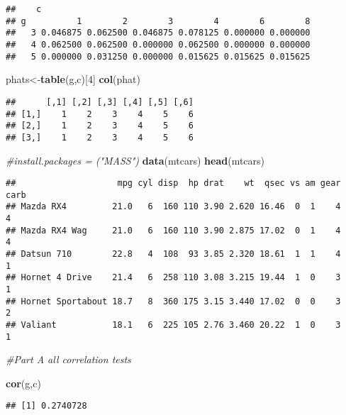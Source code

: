\documentclass[
]{article}
\newenvironment{Shaded}{\begin{snugshade}}{\end{snugshade}}
\newcommand{\CommentTok}[1]{\textcolor[rgb]{0.56,0.35,0.01}{\textit{#1}}}
\newcommand{\DecValTok}[1]{\textcolor[rgb]{0.00,0.00,0.81}{#1}}
\newcommand{\KeywordTok}[1]{\textcolor[rgb]{0.13,0.29,0.53}{\textbf{#1}}}
\newcommand{\NormalTok}[1]{#1}
\begin{document}
\begin{verbatim}
##    c
## g          1        2        3        4        6        8
##   3 0.046875 0.062500 0.046875 0.078125 0.000000 0.000000
##   4 0.062500 0.062500 0.000000 0.062500 0.000000 0.000000
##   5 0.000000 0.031250 0.000000 0.015625 0.015625 0.015625
\end{verbatim}

\begin{Shaded}
\begin{Highlighting}[]
\NormalTok{phats<-}\KeywordTok{table}\NormalTok{(g,c)[}\DecValTok{4}\NormalTok{]}
\KeywordTok{col}\NormalTok{(phat)}
\end{Highlighting}
\end{Shaded}

\begin{verbatim}
##      [,1] [,2] [,3] [,4] [,5] [,6]
## [1,]    1    2    3    4    5    6
## [2,]    1    2    3    4    5    6
## [3,]    1    2    3    4    5    6
\end{verbatim}

\begin{Shaded}
\begin{Highlighting}[]
\CommentTok{#install.packages = ("MASS")}
\KeywordTok{data}\NormalTok{(mtcars)}
\KeywordTok{head}\NormalTok{(mtcars)}
\end{Highlighting}
\end{Shaded}

\begin{verbatim}
##                    mpg cyl disp  hp drat    wt  qsec vs am gear carb
## Mazda RX4         21.0   6  160 110 3.90 2.620 16.46  0  1    4    4
## Mazda RX4 Wag     21.0   6  160 110 3.90 2.875 17.02  0  1    4    4
## Datsun 710        22.8   4  108  93 3.85 2.320 18.61  1  1    4    1
## Hornet 4 Drive    21.4   6  258 110 3.08 3.215 19.44  1  0    3    1
## Hornet Sportabout 18.7   8  360 175 3.15 3.440 17.02  0  0    3    2
## Valiant           18.1   6  225 105 2.76 3.460 20.22  1  0    3    1
\end{verbatim}

\begin{Shaded}
\begin{Highlighting}[]
\CommentTok{#Part A all correlation tests}


\KeywordTok{cor}\NormalTok{(g,c)}
\end{Highlighting}
\end{Shaded}

\begin{verbatim}
## [1] 0.2740728
\end{verbatim}
\end{document}
